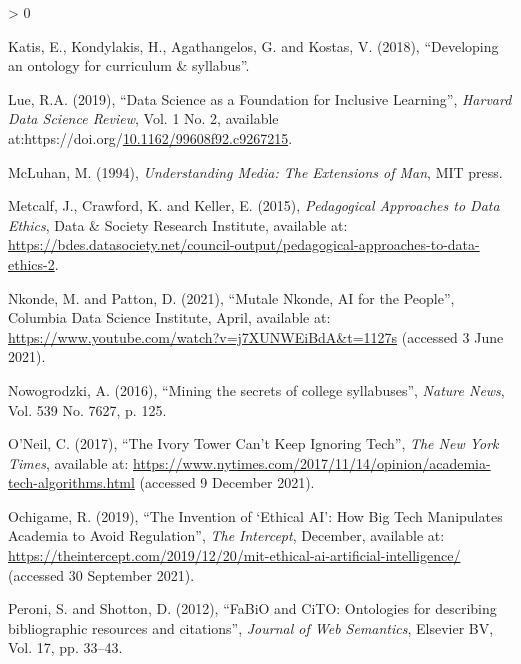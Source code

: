 \documentclass[
]{article}
\newlength{\cslhangindent}
\newenvironment{CSLReferences}[2] %
 {%
  \setlength{\parindent}{0pt}
  \ifodd #1 \everypar{\setlength{\hangindent}{\cslhangindent}}\ignorespaces\fi
  \ifnum #2 > 0
  \setlength{\parskip}{#2\baselineskip}
  \fi
 }%
 {}
\begin{document}
\begin{CSLReferences}{1}{0}
\leavevmode\hypertarget{ref-katis_2018}{}%
Katis, E., Kondylakis, H., Agathangelos, G. and Kostas, V. (2018),
{``Developing an ontology for curriculum \& syllabus''}.

\leavevmode\hypertarget{ref-lueDataScienceFoundation2019}{}%
Lue, R.A. (2019), {``Data {Science} as a {Foundation} for {Inclusive}
{Learning}''}, \emph{Harvard Data Science Review}, Vol. 1 No. 2,
available
at:https://doi.org/\href{https://doi.org/10.1162/99608f92.c9267215}{10.1162/99608f92.c9267215}.

\leavevmode\hypertarget{ref-mcluhan1994understanding}{}%
McLuhan, M. (1994), \emph{Understanding Media: The Extensions of Man},
MIT press.

\leavevmode\hypertarget{ref-metcalfPedagogicalApproachesData2015}{}%
Metcalf, J., Crawford, K. and Keller, E. (2015), \emph{Pedagogical
{Approaches} to {Data} {Ethics}}, Data \& Society Research Institute,
available at:
\url{https://bdes.datasociety.net/council-output/pedagogical-approaches-to-data-ethics-2}.

\leavevmode\hypertarget{ref-nkondeMutaleNkondeAI2021}{}%
Nkonde, M. and Patton, D. (2021), {``Mutale {Nkonde}, {AI} for the
{People}''}, Columbia Data Science Institute, April, available at:
\url{https://www.youtube.com/watch?v=j7XUNWEiBdA\&t=1127s} (accessed 3
June 2021).

\leavevmode\hypertarget{ref-nowogrodzki2016mining}{}%
Nowogrodzki, A. (2016), {``Mining the secrets of college syllabuses''},
\emph{Nature News}, Vol. 539 No. 7627, p. 125.

\leavevmode\hypertarget{ref-oneilOpinionIvoryTower2017}{}%
O'Neil, C. (2017), {``{The} {Ivory} {Tower} {Can}'t {Keep} {Ignoring}
{Tech}''}, \emph{The New York Times}, available at:
\url{https://www.nytimes.com/2017/11/14/opinion/academia-tech-algorithms.html}
(accessed 9 December 2021).

\leavevmode\hypertarget{ref-ochigameInventionEthicalAI2019}{}%
Ochigame, R. (2019), {``The {Invention} of {`{Ethical} {AI}'}: {How}
{Big} {Tech} {Manipulates} {Academia} to {Avoid} {Regulation}''},
\emph{The Intercept}, December, available at:
\url{https://theintercept.com/2019/12/20/mit-ethical-ai-artificial-intelligence/}
(accessed 30 September 2021).

\leavevmode\hypertarget{ref-peroni2012}{}%
Peroni, S. and Shotton, D. (2012), {``FaBiO and CiTO: Ontologies for
describing bibliographic resources and citations''}, \emph{Journal of
Web Semantics}, Elsevier BV, Vol. 17, pp. 33--43.


\end{CSLReferences}
\end{document}
